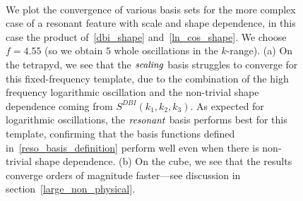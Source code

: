 \begin{figure}[!pth]
\centering     %
\\
\caption{
    We plot the convergence of various basis sets for the more complex case of a resonant
    feature with scale and shape dependence, in this case the product of~\eqref{dbi_shape}
    and~\eqref{ln_cos_shape}.
    We choose $f=4.55$ (so we obtain $5$ whole oscillations in the $k$-range).
    (a) On the tetrapyd, we see that the $\textit{scaling}$ basis struggles to converge for this fixed-frequency
    template, due to the combination of the high frequency logarithmic oscillation
    and the non-trivial shape dependence coming from $S^{DBI}(k_1,k_2,k_3)$.
    As expected for logarithmic oscillations,
    the $\textit{resonant}$ basis performs best for this template, confirming that
    the basis functions defined in~\eqref{reso_basis_definition} perform well
    even when there is non-trivial shape dependence.
    (b) On the cube, we see that the results converge orders of magnitude faster---see
    discussion in section~\ref{large_non_physical}.
}\label{fig:log_recon_osc_dbiosc}
\end{figure}


